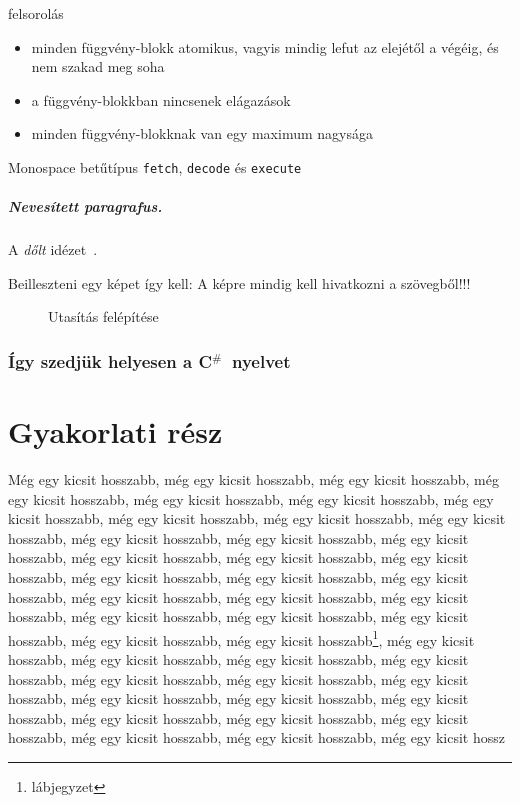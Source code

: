\documentclass[a4paper,oneside,onecolumn,12pt]{LegrandOrangeBook}
\begin{document}
felsorolás
\begin{itemize}
    \item minden függvény-blokk atomikus, vagyis mindig lefut az elejétől a végéig, és nem szakad meg soha
    \item a függvény-blokkban nincsenek elágazások
    \item minden függvény-blokknak van egy maximum nagysága
\end{itemize}


Monospace betűtípus \texttt{fetch}, \texttt{decode} és \texttt{execute}

\paragraph{Nevesített paragrafus.} A {\it dőlt}  idézet~\cite{Ubershaders:ARidiculous}.

Beilleszteni egy képet így kell: A képre mindig kell hivatkozni a szövegből!!!

\begin{figure}[ht]
    \centering
    
	\caption{Utasítás felépítése}
	\label{fig:Utasítás felépítése}
\end{figure}

\newcommand{\CS}{C${}^{\#}$}

\subsection{Így szedjük helyesen a \CS\ nyelvet}

\chapter{Gyakorlati rész}

Még egy kicsit hosszabb, még egy kicsit hosszabb, még egy kicsit hosszabb, még egy kicsit hosszabb, még egy kicsit hosszabb, még egy kicsit hosszabb, még egy kicsit hosszabb, még egy kicsit hosszabb, még egy kicsit hosszabb, még egy kicsit hosszabb, még egy kicsit hosszabb, még egy kicsit hosszabb, még egy kicsit hosszabb, még egy kicsit hosszabb, még egy kicsit hosszabb, még egy kicsit hosszabb, még egy kicsit hosszabb, még egy kicsit hosszabb, még egy kicsit hosszabb, még egy kicsit hosszabb, még egy kicsit hosszabb, még egy kicsit hosszabb, még egy kicsit hosszabb, még egy kicsit hosszabb, még egy kicsit hosszabb, még egy kicsit hosszabb, még egy kicsit hosszabb\footnote{lábjegyzet}, még egy kicsit hosszabb, még egy kicsit hosszabb, még egy kicsit hosszabb, még egy kicsit hosszabb, még egy kicsit hosszabb, még egy kicsit hosszabb, még egy kicsit hosszabb, még egy kicsit hosszabb, még egy kicsit hosszabb, még egy kicsit hosszabb, még egy kicsit hosszabb, még egy kicsit hosszabb, még egy kicsit hosszabb, még egy kicsit hosszabb, még egy kicsit hosszabb, még egy kicsit hossz
\end{document}
